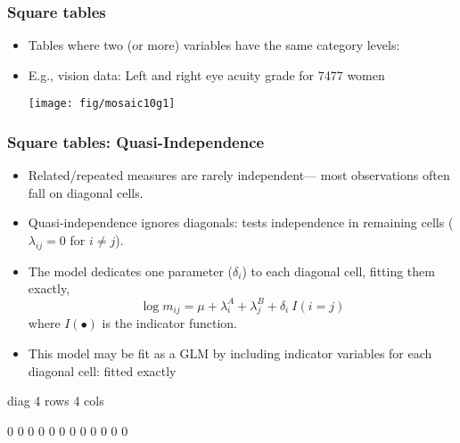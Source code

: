 \renewcommand{\FileName}{square}
\begin{frame}
  \frametitle{Square tables}
  \begin{itemize}
	\item Tables where two (or more) variables have the same category levels:
	\item E.g., vision data: Left and right eye acuity grade for 7477 women
\begin{center}
  \texttt{[image: fig/mosaic10g1]}
\end{center}
  \end{itemize}
\end{frame}

\begin{frame}[fragile]
 \frametitle{Square tables: Quasi-Independence}
		\begin{itemize}
			\item Related/repeated measures are rarely independent--- most observations often fall on \alert{diagonal cells}.
			\item \alert{Quasi-independence ignores diagonals}:  tests \alert{independence in remaining cells} ($\lambda_{ij}=0$
			for $i \ne j$).
			\item The model dedicates one parameter ($\delta_{i}$) to each diagonal cell, fitting them exactly,
	\begin{equation*}%
	 	\log m_{ij} = \mu + \lambda_i^A + \lambda_j^B + \delta_{i} \: I(i=j)
	\end{equation*}
	where $I(\bullet)$ is the indicator function.
			\item This model may be fit as a GLM by including indicator variables for each diagonal cell: fitted
			\alert{exactly}
        \end{itemize}
\begin{Output}[gobble=9,baselinestretch=0.85]
                   diag      4 rows      4 cols

                                     0         0         0
                            0                  0         0
                            0         0                  0
                            0         0         0         
\end{Output}
\end{frame}

